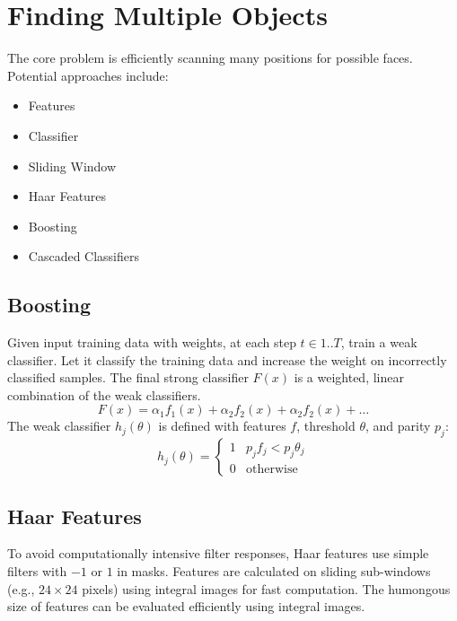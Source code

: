 \section{Finding Multiple Objects}


The core problem is efficiently scanning many positions for possible faces. Potential approaches include:
\begin{itemize}
	\item {\color{DodgerBlue4} Features}
	\item {\color{DodgerBlue4} Classifier}
	\item {\color{DodgerBlue4} Sliding Window}
	\item {\color{Firebrick1} Haar Features}
	\item {\color{Firebrick1} Boosting}
	\item {\color{Firebrick1} Cascaded Classifiers}
\end{itemize}

\subsection{Boosting}
Given input training data with weights, at each step $t \in 1..T$, train a weak classifier.
Let it classify the training data and increase the weight on incorrectly classified samples.
The final strong classifier $F(x)$ is a weighted, linear combination of the weak classifiers.
\[
F(x) = \alpha_1 f_1(x) + \alpha_2 f_2(x) + \alpha_2 f_2(x) + \dots
\]
The weak classifier $h_j (\theta)$ is defined with features $f$, threshold $\theta$, and parity $p_j$:
\[
h_j (\theta) = \begin{cases}
1 & p_j f_j < p_j \theta_j \\
0 & \text{otherwise}
\end{cases}
\]

\subsection{Haar Features}
To avoid computationally intensive filter responses, Haar features use simple filters with $-1$ or $1$ in masks.
Features are calculated on sliding sub-windows (e.g., $24\times24$ pixels) using integral images for fast computation.
The humongous size of features can be evaluated efficiently using integral images.

